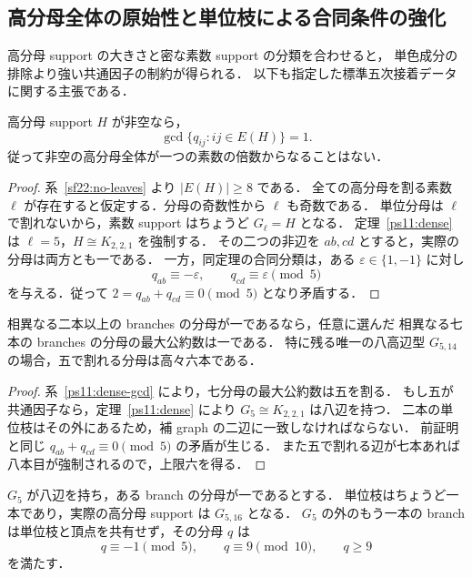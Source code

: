\subsection{高分母全体の原始性と単位枝による合同条件の強化}
\label{gp23:section}

高分母 support の大きさと密な素数 support の分類を合わせると，
単色成分の排除より強い共通因子の制約が得られる．
以下も指定した標準五次接着データに関する主張である．

\begin{corollary}[高分母全体は原始的である]
\label{gp23:primitive}
高分母 support $H$ が非空なら，
\[
 \gcd\{q_{ij}:ij\in E(H)\}=1.
\]
従って非空の高分母全体が一つの素数の倍数からなることはない．
\end{corollary}

\begin{proof}
系~\ref{sf22:no-leaves} より $|E(H)|\ge8$ である．
全ての高分母を割る素数 $\ell$ が存在すると仮定する．分母の奇数性から $\ell$ も奇数である．
単位分母は $\ell$ で割れないから，素数 support はちょうど $G_\ell=H$ となる．
定理~\ref{ps11:dense} は
$\ell=5$，$H\cong K_{2,2,1}$ を強制する．
その二つの非辺を $ab,cd$ とすると，実際の分母は両方とも一である．
一方，同定理の合同分類は，ある $\varepsilon\in\{1,-1\}$ に対し
\[
 q_{ab}\equiv-\varepsilon,\qquad q_{cd}\equiv\varepsilon\pmod5
\]
を与える．従って $2=q_{ab}+q_{cd}\equiv0\pmod5$ となり矛盾する．
\end{proof}

\begin{corollary}[二本の単位枝と七分母の互いに素性]
\label{gp23:two-units}
相異なる二本以上の branches の分母が一であるなら，任意に選んだ
相異なる七本の branches の分母の最大公約数は一である．
特に残る唯一の八高辺型 $G_{5,14}$ の場合，五で割れる分母は高々六本である．
\end{corollary}

\begin{proof}
系~\ref{ps11:dense-gcd} により，七分母の最大公約数は五を割る．
もし五が共通因子なら，定理~\ref{ps11:dense} により
$G_5\cong K_{2,2,1}$ は八辺を持つ．
二本の単位枝はその外にあるため，補 graph の二辺に一致しなければならない．
前証明と同じ $q_{ab}+q_{cd}\equiv0\pmod5$ の矛盾が生じる．
また五で割れる辺が七本あれば八本目が強制されるので，上限六を得る．
\end{proof}

\begin{corollary}[一本の単位枝がある密な五進配置]
\label{gp23:one-unit-dense-five}
$G_5$ が八辺を持ち，ある branch の分母が一であるとする．
単位枝はちょうど一本であり，実際の高分母 support は $G_{5,16}$ となる．
$G_5$ の外のもう一本の branch は単位枝と頂点を共有せず，その分母 $q$ は
\[
 q\equiv-1\pmod5,\qquad q\equiv9\pmod{10},\qquad q\ge9
\]
を満たす．
\end{corollary}

